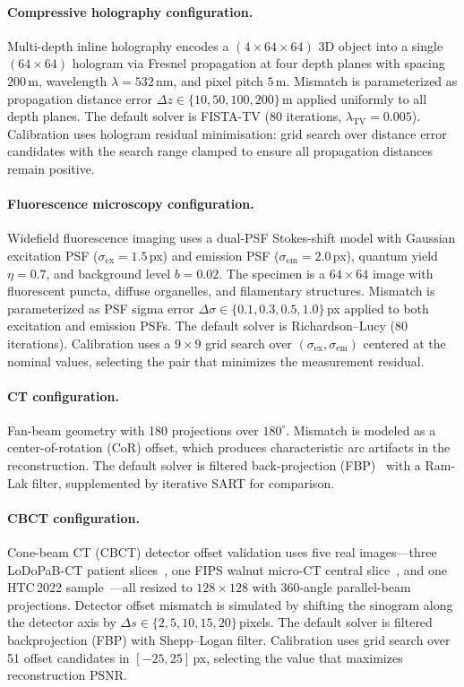 \paragraph{Compressive holography configuration.}
Multi-depth inline holography encodes a $(4 \times 64 \times 64)$ 3D
object into a single $(64 \times 64)$ hologram via Fresnel propagation at
four depth planes with spacing $200$\,\textmu m, wavelength
$\lambda = 532$\,nm, and pixel pitch $5$\,\textmu m.  Mismatch is
parameterized as propagation distance error
$\Delta z \in \{10, 50, 100, 200\}$\,\textmu m applied uniformly to all
depth planes.  The default solver is FISTA-TV (80 iterations,
$\lambda_{\mathrm{TV}} = 0.005$).  Calibration uses hologram residual
minimisation: grid search over distance error candidates with the search
range clamped to ensure all propagation distances remain positive.

\paragraph{Fluorescence microscopy configuration.}
Widefield fluorescence imaging uses a dual-PSF Stokes-shift model with
Gaussian excitation PSF ($\sigma_{\mathrm{ex}} = 1.5$\,px) and emission
PSF ($\sigma_{\mathrm{em}} = 2.0$\,px), quantum yield $\eta = 0.7$, and
background level $b = 0.02$.  The specimen is a $64 \times 64$ image with
fluorescent puncta, diffuse organelles, and filamentary structures.
Mismatch is parameterized as PSF sigma error
$\Delta\sigma \in \{0.1, 0.3, 0.5, 1.0\}$\,px applied to both excitation
and emission PSFs.  The default solver is Richardson--Lucy (80 iterations).
Calibration uses a $9 \times 9$ grid search over
$(\sigma_{\mathrm{ex}}, \sigma_{\mathrm{em}})$ centered at the nominal
values, selecting the pair that minimizes the measurement residual.

\paragraph{CT configuration.}
Fan-beam geometry with 180 projections over $180^\circ$.  Mismatch is
modeled as a center-of-rotation (CoR) offset, which produces
characteristic arc artifacts in the reconstruction.  The default solver
is filtered back-projection (FBP)~\cite{feldkamp1984practical} with a Ram-Lak filter, supplemented
by iterative SART for comparison.

\paragraph{CBCT configuration.}
Cone-beam CT (CBCT) detector offset validation uses five real images---three
LoDoPaB-CT patient slices~\cite{leuschner2021lodopab}, one FIPS walnut
micro-CT central slice~\cite{hamalainen2015fips}, and one HTC\,2022
sample~\cite{meaney2022htc}---all resized to $128 \times 128$ with
360-angle parallel-beam projections.  Detector offset mismatch is simulated
by shifting the sinogram along the detector axis by
$\Delta s \in \{2, 5, 10, 15, 20\}$\,pixels.  The default solver is
filtered backprojection (FBP) with Shepp--Logan filter.  Calibration uses
grid search over 51 offset candidates in $[-25, 25]$\,px, selecting the
value that maximizes reconstruction PSNR.

